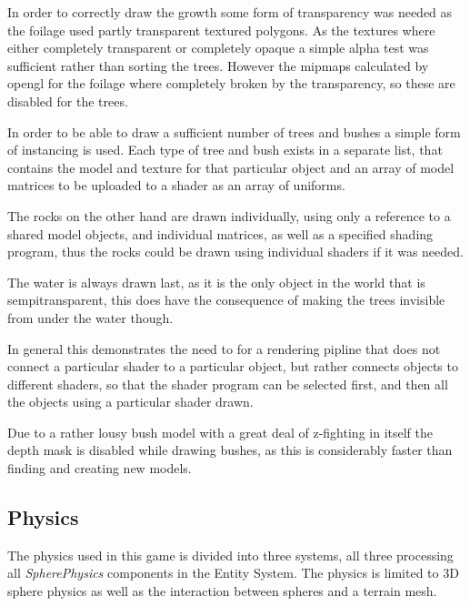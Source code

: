 In order to correctly draw the growth some form of transparency was needed as the foilage used partly transparent textured polygons. As the textures where either completely transparent or completely opaque a simple alpha test was sufficient rather than sorting the trees. However the mipmaps calculated by opengl for the foilage where completely broken by the transparency, so these are disabled for the trees.

In order to be able to draw a sufficient number of trees and bushes a simple form of instancing is used. Each type of tree and bush exists in a separate list, that contains the model and texture for that particular object and an array of model matrices to be uploaded to a shader as an array of uniforms.

The rocks on the other hand are drawn individually, using only a reference to a shared model objects, and individual matrices, as well as a specified shading program, thus the rocks could be drawn using individual shaders if it was needed.

The water is always drawn last, as it is the only object in the world that is sempitransparent, this does have the consequence of making the trees invisible from under the water though.

In general this demonstrates the need to for a rendering pipline that does not connect a particular shader to a particular object, but rather connects objects to different shaders, so that the shader program can be selected first, and then all the objects using a particular shader drawn.

Due to a rather lousy bush model with a great deal of z-fighting in itself the depth mask is disabled while drawing bushes, as this is considerably faster than finding and creating new models.

\subsection{Physics}
The physics used in this game is divided into three systems, all three processing all \textit{SpherePhysics} components in the Entity System. The physics is limited to 3D sphere physics as well as the interaction between spheres and a terrain mesh.

